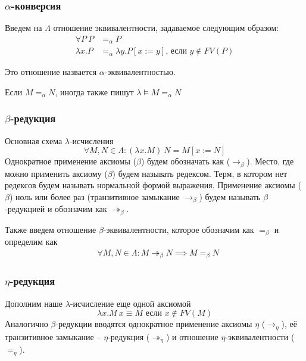 \documentclass{beamer}
\newcommand{\rb}{\rightarrow_\beta}
\newcommand{\rbm}{\twoheadrightarrow_\beta}
\newcommand{\rn}{\rightarrow_\eta}
\newcommand{\rnm}{\twoheadrightarrow_\eta}
\begin{document}
\begin{frame}\frametitle{$\alpha$-конверсия}
    
Введем на $\Lambda$ отношение эквивалентности, задаваемое следующим образом:
\begin{align*}
	\forall P\ P &=_\alpha P\\
	\lambda x.P &=_\alpha \lambda y.P[x:=y] \text{, если } y \not\in FV(P)
\end{align*}

Это отношение назвается $\alpha$-эквивалентностью.

Если $M =_\alpha N$, иногда также пишут $\lambda\models M =_\alpha N$

\end{frame}

\begin{frame}\frametitle{$\beta$-редукция}
    
Основная схема $\lambda$-исчисления
\begin{equation*}
	\forall M, N \in \Lambda : (\lambda x.M)\ N = M[x := N]\tag{$\beta$}
\end{equation*}
Однократное применение аксиомы ($\beta$) будем обозначать как ($\rb$).
Место, где можно применить аксиому ($\beta$) будем называть редексом.
Терм, в котором нет редексов будем называть нормальной формой выражения.
Применение аксиомы ($\beta$) ноль или более раз (транзитивное замыкание $\rb$) будем называть $\beta$-редукцией и обозначим как $\rbm$.

Также введем отношение $\beta$-эквивалентности, которое обозначим как $=_\beta$ и определим как
\begin{align*}
	&\forall M,N \in \Lambda: M \rbm N \implies M=_\beta N
\end{align*}

\end{frame}

\begin{frame}\frametitle{$\eta$-редукция}
    
Дополним наше $\lambda$-исчисление еще одной аксиомой
\begin{equation*}
	\lambda x.M\ x \equiv M \text{ если }x \not\in FV(M) \tag{$\eta$}
\end{equation*}
Аналогично $\beta$-редукции вводятся однократное применение аксиомы $\eta$ ($\rn$), её транзитивное замыкание -- $\eta$-редукция ($\rnm$) и отношение $\eta$-эквивалентности ($=_\eta$).

\end{frame}
\end{document}
